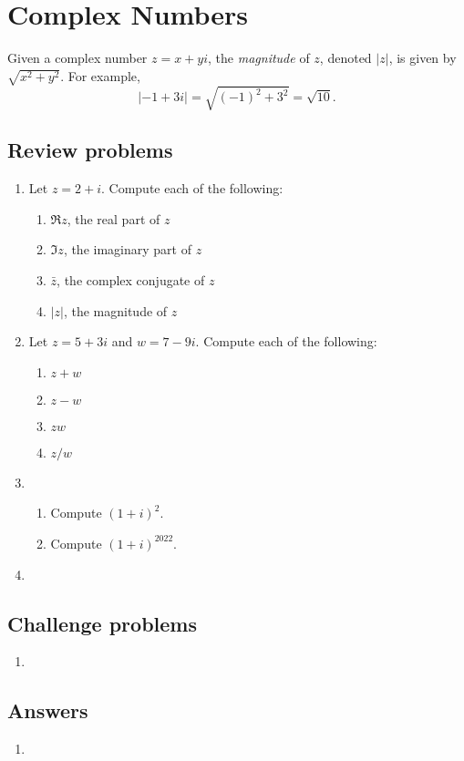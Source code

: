 \section{Complex Numbers}

Given a complex number $z = x + yi$, the \emph{magnitude} of $z$, denoted $\lvert z\rvert$, is given by $\sqrt{x^2 + y^2}$. For example,
\begin{equation*}
\lvert -1 + 3i\rvert = \sqrt{(-1)^2 + 3^2} = \sqrt{10}.
\end{equation*}

\subsection{Review problems}

\begin{enumerate}
\item Let $z = 2 + i$. Compute each of the following:
\begin{enumerate}
\item $\Re z$, the real part of $z$
\item $\Im z$, the imaginary part of $z$
\item $\bar{z}$, the complex conjugate of $z$
\item $\lvert z\rvert$, the magnitude of $z$
\end{enumerate}
\item Let $z = 5 + 3i$ and $w = 7 - 9i$. Compute each of the following:
\begin{enumerate}
\item $z + w$
\item $z - w$
\item $zw$
\item $z/w$
\end{enumerate}
\item \begin{enumerate}
\item Compute $(1 + i)^2$.
\item Compute $(1 + i)^{2022}$.
\end{enumerate}
\item 
\end{enumerate}


\subsection{Challenge problems}

\begin{enumerate}[resume]
\item 
\end{enumerate}


\subsection{Answers}

\begin{enumerate}
\item 
\end{enumerate}